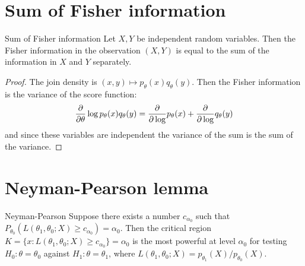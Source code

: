 \documentclass[12pt]{extarticle}
\begin{document}
\section{Sum of Fisher information}

\begin{lemma}{Sum of Fisher information}{}
	Let $X, Y$ be independent random variables.
	Then the Fisher information in the observation $(X, Y)$ is equal to the sum
	of the information in $X$ and $Y$ separately.
\end{lemma}

\begin{proof}
	The join density is $(x, y) \mapsto p_\theta(x) q_\theta(y)$.
	Then the Fisher information is the variance of the score function:
	\begin{equation}
		\pdv{\theta} \log p_\theta(x) q_\theta(y) = \pdv \log p_\theta(x) + \pdv \log q_\theta(y)
	\end{equation}
	and since these variables are independent the variance of the sum is the sum of the variance.
\end{proof}

\section{Neyman-Pearson lemma}

\begin{theorem}{Neyman-Pearson}{}
	Suppose there exists a number $c_{\alpha_0}$ such that
	$P_{\theta_0}(L(\theta_1, \theta_0; X) \geq c_{\alpha_0}) = \alpha_0$.
	Then the critical region
	$K = \{ x: L(\theta_1, \theta_0; X) \geq c_{\alpha_0} \} = \alpha_0$
	is the most powerful at level $\alpha_0$
	for testing $H_0: \theta = \theta_0$ against $H_1: \theta = \theta_1$,
	where $L(\theta_1, \theta_0; X) = p_{\theta_1}(X) / p_{\theta_0}(X)$.
\end{theorem}
\end{document}
